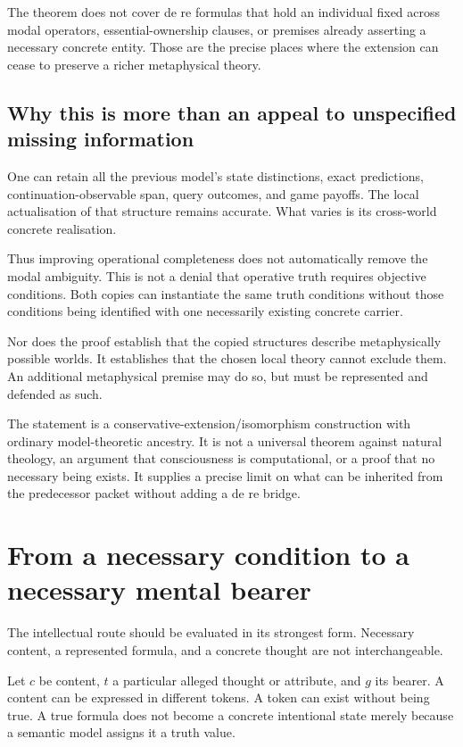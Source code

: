 \documentclass[11pt,a4paper]{article}
\begin{document}
The theorem does not cover de re formulas that hold an individual fixed
across modal operators, essential-ownership clauses, or premises already
asserting a necessary concrete entity. Those are the precise places
where the extension can cease to preserve a richer metaphysical theory.

\subsection{Why this is more than an appeal to unspecified missing
information}\label{why-this-is-more-than-an-appeal-to-unspecified-missing-information}

One can retain all the previous model's state distinctions, exact
predictions, continuation-observable span, query outcomes, and game
payoffs. The local actualisation of that structure remains accurate.
What varies is its cross-world concrete realisation.

Thus improving operational completeness does not automatically remove
the modal ambiguity. This is not a denial that operative truth requires
objective conditions. Both copies can instantiate the same truth
conditions without those conditions being identified with one
necessarily existing concrete carrier.

Nor does the proof establish that the copied structures describe
metaphysically possible worlds. It establishes that the chosen local
theory cannot exclude them. An additional metaphysical premise may do
so, but must be represented and defended as such.

The statement is a conservative-extension/isomorphism construction with
ordinary model-theoretic ancestry. It is not a universal theorem against
natural theology, an argument that consciousness is computational, or a
proof that no necessary being exists. It supplies a precise limit on
what can be inherited from the predecessor packet without adding a de re
bridge.

\section{From a necessary condition to a necessary mental
bearer}\label{from-a-necessary-condition-to-a-necessary-mental-bearer}

The intellectual route should be evaluated in its strongest form.
Necessary content, a represented formula, and a concrete thought are not
interchangeable.

Let \(c\) be content, \(t\) a particular alleged thought or attribute,
and \(g\) its bearer. A content can be expressed in different tokens. A
token can exist without being true. A true formula does not become a
concrete intentional state merely because a semantic model assigns it a
truth value.
\end{document}
